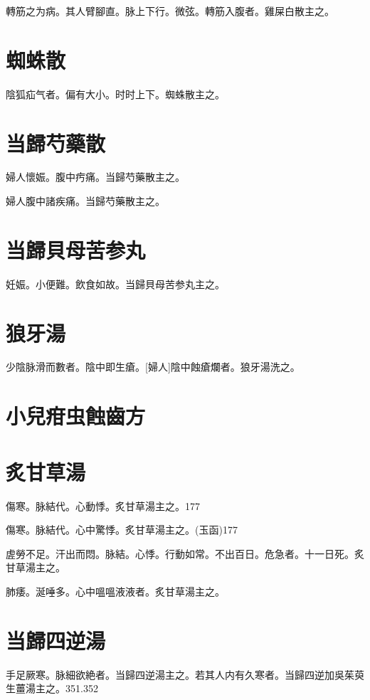\documentclass[12pt,twoside,UTF8,b5paper]{ctexbook}
\begin{document}
轉筋之为病。其人臂腳直。脉上下行。微弦。轉筋入腹者。雞屎白散主之。

\section{蜘蛛散}

陰狐疝气者。偏有大小。时时上下。蜘蛛散主之。

\section{当歸芍藥散}

婦人懷娠。腹中㽲痛。当歸芍藥散主之。

婦人腹中諸疾痛。当歸芍藥散主之。

\section{当歸貝母苦参丸}

妊娠。小便難。飲食如故。当歸貝母苦参丸主之。

\section{狼牙湯}

少陰脉滑而數者。陰中即生瘡。[婦人]陰中蝕瘡爛者。狼牙湯洗之。

\section{小兒疳虫蝕齒方}

\section{炙甘草湯}

傷寒。脉結代。心動悸。炙甘草湯主之。177

傷寒。脉結代。心中驚悸。炙甘草湯主之。(玉函)177

虗勞不足。汗出而悶。脉結。心悸。行動如常。不出百日。危急者。十一日死。炙甘草湯主之。

肺痿。涎唾多。心中嗢嗢液液者。炙甘草湯主之。

\section{当歸四逆湯}

手足厥寒。脉細欲絶者。当歸四逆湯主之。若其人内有久寒者。当歸四逆加吳茱萸生薑湯主之。351.352
\end{document}
